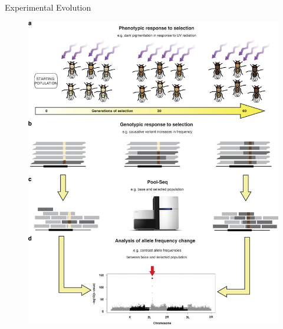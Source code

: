 \documentclass[t]{beamer} %
\begin{document}
\begin{frame}
Experimental Evolution
\begin{figure}
\includegraphics[trim={0 2.1in 0 0},clip, scale=0.6]{eg.jpg} 
\end{figure}
\end{frame}
\end{document}
